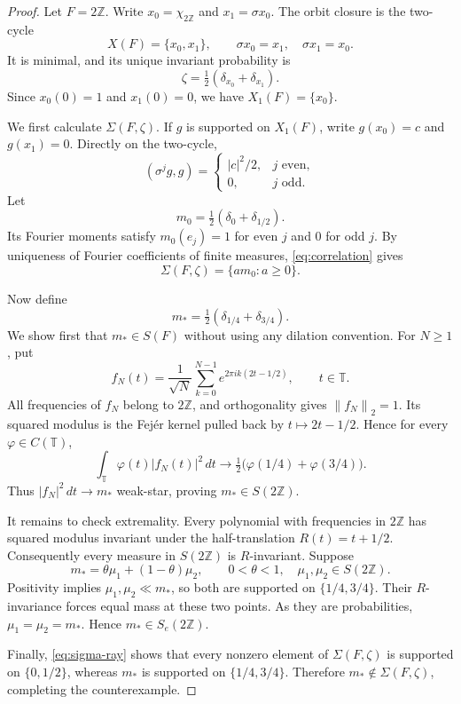 \documentclass[11pt]{article}
\newcommand{\T}{\mathbb T}
\newcommand{\Z}{\mathbb Z}
\newcommand{\norm}[1]{\left\lVert #1\right\rVert}
\begin{document}
\begin{proof}
Let $F=2\Z$. Write $x_0=\chi_{2\Z}$ and $x_1=\sigma x_0$. The orbit closure is
the two-cycle
\[
 X(F)=\{x_0,x_1\},\qquad \sigma x_0=x_1,\quad\sigma x_1=x_0.
\]
It is minimal, and its unique invariant probability is
\[
 \zeta=\tfrac12(\delta_{x_0}+\delta_{x_1}).
\]
Since $x_0(0)=1$ and $x_1(0)=0$, we have $X_1(F)=\{x_0\}$.

We first calculate $\Sigma(F,\zeta)$. If $g$ is supported on $X_1(F)$, write
$g(x_0)=c$ and $g(x_1)=0$. Directly on the two-cycle,
\begin{equation}\label{eq:correlation}
 (\sigma^jg,g)=
 \begin{cases}
 |c|^2/2,&j\text{ even},\\
 0,&j\text{ odd}.
 \end{cases}
\end{equation}
Let
\[
 m_0=\tfrac12(\delta_0+\delta_{1/2}).
\]
Its Fourier moments satisfy $m_0(e_j)=1$ for even $j$ and $0$ for odd $j$.
By uniqueness of Fourier coefficients of finite measures, \eqref{eq:correlation}
gives
\begin{equation}\label{eq:sigma-ray}
 \Sigma(F,\zeta)=\{a m_0:a\ge0\}.
\end{equation}

Now define
\[
 m_*=\tfrac12(\delta_{1/4}+\delta_{3/4}).
\]
We show first that $m_*\in S(F)$ without using any dilation convention. For
$N\ge1$, put
\[
 f_N(t)=\frac1{\sqrt N}\sum_{k=0}^{N-1}
             e^{2\pi i k(2t-1/2)},\qquad t\in\T.
\]
All frequencies of $f_N$ belong to $2\Z$, and orthogonality gives
$\norm{f_N}_2=1$. Its squared modulus is the Fejér kernel pulled back by
$t\mapsto2t-1/2$. Hence for every $\varphi\in C(\T)$,
\[
 \int_{\T}\varphi(t)|f_N(t)|^2\,dt
 \longrightarrow\tfrac12\bigl(\varphi(1/4)+\varphi(3/4)\bigr).
\]
Thus $|f_N|^2\,dt\to m_*$ weak-star, proving $m_*\in S(2\Z)$.

It remains to check extremality. Every polynomial with frequencies in $2\Z$
has squared modulus invariant under the half-translation
$R(t)=t+1/2$. Consequently every measure in $S(2\Z)$ is $R$-invariant.
Suppose
\[
 m_*=\theta\mu_1+(1-\theta)\mu_2,
 \qquad 0<\theta<1,\quad \mu_1,\mu_2\in S(2\Z).
\]
Positivity implies $\mu_1,\mu_2\ll m_*$, so both are supported on
$\{1/4,3/4\}$. Their $R$-invariance forces equal mass at these two points.
As they are probabilities, $\mu_1=\mu_2=m_*$. Hence $m_*\in S_e(2\Z)$.

Finally, \eqref{eq:sigma-ray} shows that every nonzero element of
$\Sigma(F,\zeta)$ is supported on $\{0,1/2\}$, whereas $m_*$ is supported on
$\{1/4,3/4\}$. Therefore $m_*\notin\Sigma(F,\zeta)$, completing the
counterexample.
\end{proof}
\end{document}
